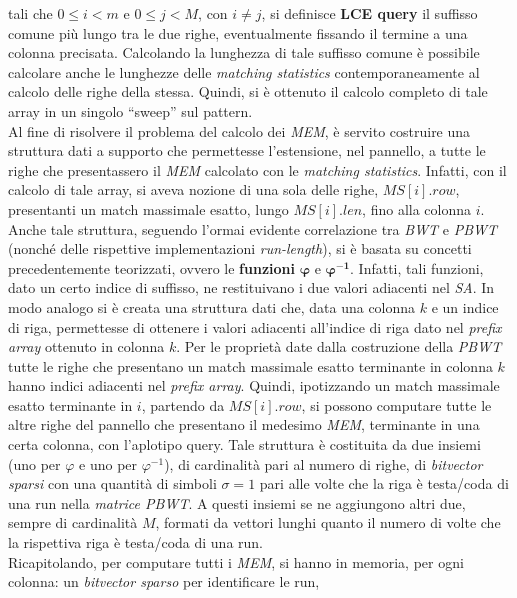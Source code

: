 \documentclass[a4paper,11pt, oneside,italian]{article}
\begin{document}
tali che $0\leq i <m$ e $0\leq j <M$, con $i\neq j$, si definisce \textbf{LCE
  query} il suffisso comune più lungo tra le due righe, eventualmente fissando
il termine a una colonna precisata. Calcolando la
lunghezza di tale suffisso comune è possibile calcolare anche le
lunghezze delle \textit{matching statistics} contemporaneamente al calcolo delle
righe della stessa. Quindi, si è ottenuto il calcolo completo di tale array in
un singolo ``sweep'' sul pattern.\\
Al fine di risolvere il problema del calcolo dei \textit{MEM}, è
servito 
costruire una struttura dati a supporto che permettesse l'estensione, nel
pannello, a tutte le righe che presentassero il \textit{MEM} calcolato con le
\textit{matching statistics}. Infatti, con il calcolo di tale array, si aveva
nozione di una sola delle righe, $MS[i].row$, presentanti un match massimale
esatto, lungo 
$MS[i].len$, fino alla colonna $i$. Anche tale struttura, seguendo l'ormai
evidente correlazione tra \textit{BWT} e \textit{PBWT} (nonché delle rispettive
implementazioni \textit{run-length}), si è basata su concetti precedentemente
teorizzati, ovvero le \textbf{funzioni} $\boldsymbol\varphi$ e
$\boldsymbol\varphi^{\mathbf{-1}}$. Infatti, tali
funzioni, dato un certo indice di suffisso, ne restituivano i due valori
adiacenti nel \textit{SA}. In
modo analogo si è creata una struttura dati che, data una colonna $k$ e un
indice di riga, permettesse di ottenere i valori adiacenti all'indice di riga
dato nel \textit{prefix array} ottenuto in colonna $k$. Per le proprietà date
dalla costruzione della \textit{PBWT} tutte le righe che presentano un match
massimale esatto terminante in colonna $k$ hanno indici adiacenti nel
\textit{prefix array}. Quindi, ipotizzando un match massimale esatto terminante
in $i$, partendo da 
$MS[i].row$, si possono computare tutte le altre righe del pannello che
presentano il medesimo \textit{MEM}, terminante in una certa colonna, con
l'aplotipo query. Tale 
struttura è costituita 
da due insiemi (uno per $\varphi$ e uno per $\varphi^{-1}$), di cardinalità pari
  al numero di righe, di \textit{bitvector sparsi} con una quantità di simboli 
$\sigma=1$ pari alle volte che la riga è testa/coda di una run nella
\textit{matrice PBWT}. A questi insiemi
se ne aggiungono altri due, sempre di cardinalità
$M$, formati da vettori lunghi 
quanto il numero di volte che la rispettiva riga è testa/coda di una run.\\
Ricapitolando, per computare tutti i \textit{MEM}, si hanno in
memoria, per ogni colonna: un \textit{bitvector sparso} per identificare le run,
\end{document}
